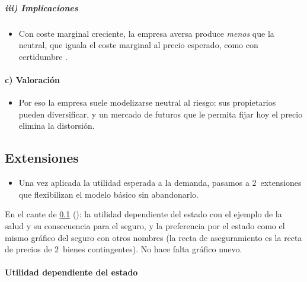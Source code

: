 \documentclass[11pt]{article}
\begin{document}
\subparagraph{iii) Implicaciones}

\begin{itemize}
\item Con coste marginal creciente, la empresa aversa produce \emph{menos} que la neutral, que iguala el coste marginal al precio esperado, como con certidumbre .
\end{itemize}

\paragraph{c) Valoración}

\begin{itemize}
\item Por eso la empresa suele modelizarse neutral al riesgo: sus propietarios pueden diversificar, y un mercado de futuros que le permita fijar hoy el precio elimina la distorsión.
\end{itemize}

\subsection{Extensiones}\label{sec:extensiones}

\begin{itemize}
\item Una vez aplicada la utilidad esperada a la demanda, pasamos a 2~extensiones que flexibilizan el modelo básico sin abandonarlo.
\end{itemize}

\begin{notaopositor}
En el cante de \ref{sec:extensiones} (): la utilidad dependiente del estado con el ejemplo de la salud y su consecuencia para el seguro, y la preferencia por el estado como el mismo gráfico del seguro con otros nombres (la recta de aseguramiento es la recta de precios de 2~bienes contingentes). No hace falta gráfico nuevo.
\end{notaopositor}

\paragraph{Utilidad dependiente del estado}
\end{document}
